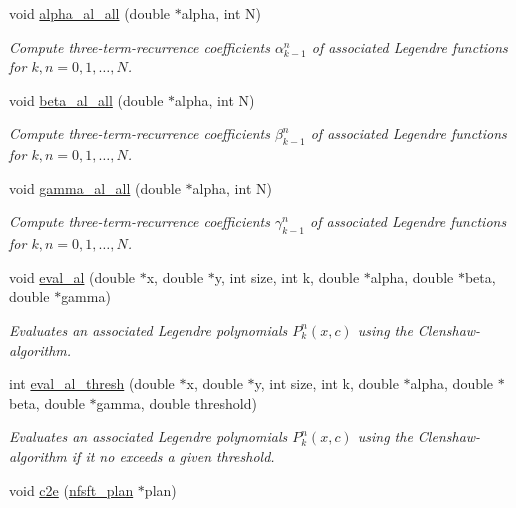 \begin{CompactItemize}
\item 
void \hyperlink{group__nfsft_ga18}{alpha\_\-al\_\-all} (double $\ast$alpha, int N)
\begin{CompactList}\small\item\em Compute three-term-recurrence coefficients $\alpha_{k-1}^n$ of associated Legendre functions for $k,n = 0,1,\ldots,N$. \item\end{CompactList}\item 
void \hyperlink{group__nfsft_ga19}{beta\_\-al\_\-all} (double $\ast$alpha, int N)
\begin{CompactList}\small\item\em Compute three-term-recurrence coefficients $\beta_{k-1}^n$ of associated Legendre functions for $k,n = 0,1,\ldots,N$. \item\end{CompactList}\item 
void \hyperlink{group__nfsft_ga20}{gamma\_\-al\_\-all} (double $\ast$alpha, int N)
\begin{CompactList}\small\item\em Compute three-term-recurrence coefficients $\gamma_{k-1}^n$ of associated Legendre functions for $k,n = 0,1,\ldots,N$. \item\end{CompactList}\item 
void \hyperlink{group__nfsft_ga21}{eval\_\-al} (double $\ast$x, double $\ast$y, int size, int k, double $\ast$alpha, double $\ast$beta, double $\ast$gamma)
\begin{CompactList}\small\item\em Evaluates an associated Legendre polynomials $P_k^n(x,c)$ using the Clenshaw-algorithm. \item\end{CompactList}\item 
int \hyperlink{group__nfsft_ga22}{eval\_\-al\_\-thresh} (double $\ast$x, double $\ast$y, int size, int k, double $\ast$alpha, double $\ast$beta, double $\ast$gamma, double threshold)
\begin{CompactList}\small\item\em Evaluates an associated Legendre polynomials $P_k^n(x,c)$ using the Clenshaw-algorithm if it no exceeds a given threshold. \item\end{CompactList}\item 
void \hyperlink{group__nfsft_ga23}{c2e} (\hyperlink{structnfsft__plan}{nfsft\_\-plan} $\ast$plan)

\end{CompactItemize}
